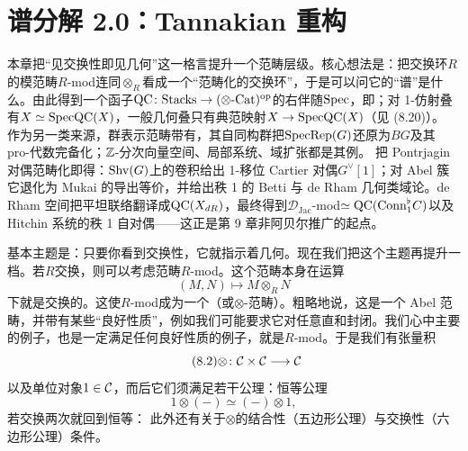 \chapter{谱分解 2.0：Tannakian 重构}\label{ch:08}

\begin{keytakeaways}
本章把“见交换性即见几何”这一格言提升一个范畴层级。核心想法是：把交换环$R$的模范畴$R$-mod连同$\otimes_R$看成一个“范畴化的交换环”，于是可以问它的“谱”是什么。由此得到一个函子$\mathrm{QC}\colon\mathrm{Stacks}\to(\otimes\text{-}\mathrm{Cat})^{\mathrm{op}}$的右伴随$\mathrm{Spec}$，即；对 1-仿射叠有$X\simeq\mathrm{Spec}\mathrm{QC}(X)$，一般几何叠只有典范映射$X\to\mathrm{Spec}\mathrm{QC}(X)$（见 (8.20)）。
作为另一类来源，群表示范畴带有，其自同构群把$\mathrm{Spec}\mathrm{Rep}(G)$还原为$BG$及其 pro-代数完备化；$\mathbb{Z}$-分次向量空间、局部系统、域扩张都是其例。
把 Pontrjagin 对偶范畴化即得：$\mathrm{Shv}(G)$上的卷积给出 1-移位 Cartier 对偶$G^{\vee}[1]$；对 Abel 簇它退化为 Mukai 的导出等价，并给出秩 1 的 Betti 与 de Rham 几何类域论。de Rham 空间把平坦联络翻译成$\mathrm{QC}(X_{dR})$，最终得到$\mathcal D_{\mathrm{Jac}}$-mod$\simeq\mathrm{QC}(\mathrm{Conn}^{\flat}_1 C)$以及 Hitchin 系统的秩 1 自对偶——这正是第 9 章非阿贝尔推广的起点。
\end{keytakeaways}

基本主题是：只要你看到交换性，它就指示着几何。现在我们把这个主题再提升一档。若$R$交换，则可以考虑范畴$R$-mod。这个范畴本身在运算
\begin{equation}\tag{8.1}
(M,N)\longmapsto M\otimes_{R}N
\end{equation}
下就是交换的。这使$R$-mod成为一个（或$\otimes$-范畴）。粗略地说，这是一个 Abel 范畴，并带有某些“良好性质”，例如我们可能要求它对任意直和封闭。我们心中主要的例子，也是一定满足任何良好性质的例子，就是$R$-mod。于是我们有张量积
\begin{equation}\tag{8.2}
\otimes\colon \mathcal{C}\times\mathcal{C}\longrightarrow \mathcal{C}
\end{equation}
以及单位对象$1\in\mathcal{C}$，而后它们须满足若干公理：恒等公理
\begin{equation}\tag{8.3}
1\otimes(-)\simeq(-)\otimes 1,
\end{equation}
若交换两次就回到恒等：
此外还有关于$\otimes$的结合性（五边形公理）与交换性（六边形公理）条件。

